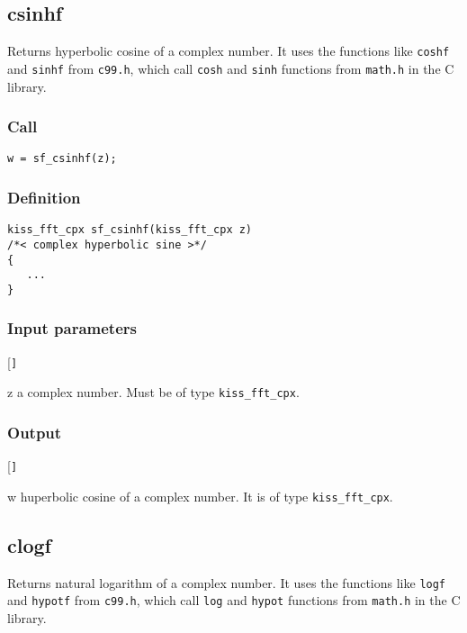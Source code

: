 \subsection{{csinhf}}
Returns hyperbolic cosine of a complex number. It uses the functions like \texttt{coshf} and \texttt{sinhf} from \texttt{c99.h}, which call \texttt{cosh} and \texttt{sinh} functions from \texttt{math.h} in the C library.

\subsubsection*{Call}
\begin{verbatim}w = sf_csinhf(z);\end{verbatim}

\subsubsection*{Definition}
\begin{verbatim}
kiss_fft_cpx sf_csinhf(kiss_fft_cpx z)
/*< complex hyperbolic sine >*/
{
   ...
}
\end{verbatim}

\subsubsection*{Input parameters}
\begin{desclist}{\tt }{\quad}[\tt ]
   \setlength\itemsep{0pt}
   \item[z] a complex number. Must be of type \texttt{kiss\_fft\_cpx}.
\end{desclist}

\subsubsection*{Output}
\begin{desclist}{\tt }{\quad}[\tt ]
   \setlength\itemsep{0pt}
   \item[w] huperbolic cosine of a complex number. It is of type \texttt{kiss\_fft\_cpx}.
\end{desclist}




\subsection{{clogf}}
Returns natural logarithm of a complex number. It uses the functions like \texttt{logf} and \texttt{hypotf} from \texttt{c99.h}, which call \texttt{log} and \texttt{hypot} functions from \texttt{math.h} in the C library.


